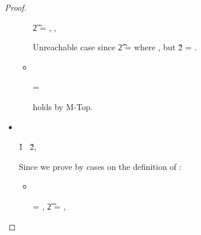 \begin{lemma}
\begin{proof}
\begin{itemize}
\begin{subcase}[\isaopsem{\class{1}}{\class{2}} = {\true{}}, \text{if}\ \issubtypein{}{\class{1}}{\class{2}}]
\begin{itemize}
\begin{subcase}
                    \t{2} = {\Value{\singletonmeta{}}}, 
                    {\singletonmeta{}} \notequal \class{},

                    Unreachable case since 
                    \t{2} = {\Value{\singletonmeta{}}} where 
                    {\singletonmeta{}} \notequal \class{},
                    but \v{2} = .
                  \end{subcase}
                \item[]
                  \begin{subcase}[\isacompare{\s{}}{\object{}}{\t{}} {\filterset{\topprop{}} {\topprop{}}}]
                    \ 

                    {\thenprop{\prop{}}} = {\topprop{}}

                    {\satisfies{\openv{}}{\topprop{}}} holds by M-Top.

                  \end{subcase}
              \end{itemize}
            \end{subcase}
          \item[]
            \begin{subcase}[\isaopsem{\v{1}}{\v{2}} = {\false{}}, otherwise]
              \ 

              \v{1} \notequal\ \v{2},
              \isfalseval{\v{}}
              
              Since \isfalseval{\v{}} we prove {\satisfies{\openv{}}{\elseprop{\prop{}}}}
              by cases on the definition of \isacompareliteral{}:
              \begin{itemize} %
                \item[]
                  \begin{subcase}[\isacompare{\s{}}{\pth{\classpe{}}{\pth{\pathelem{}}{\x{}}}}{\Value{\class{}}}
                                 {\filterset{\isprop{\class{}} {\pth{\pathelem{}}{\x{}}}}
                                            {\notprop{\class{}}{\pth{\pathelem{}}{\x{}}}}}]
                    \ 


                     = {\pth{\classpe{}}{\pth{\pathelem{}}{\x{}}}},
                    \t{2} = {\Value{\class{}}},
                    \inpropenv{\notprop{\class{}} {\pth{\pathelem{}}{\x{}}}}{\elseprop{\prop{}}}


\end{subcase}
\end{itemize}
\end{subcase}
\end{itemize}
\end{proof}
\end{lemma}
